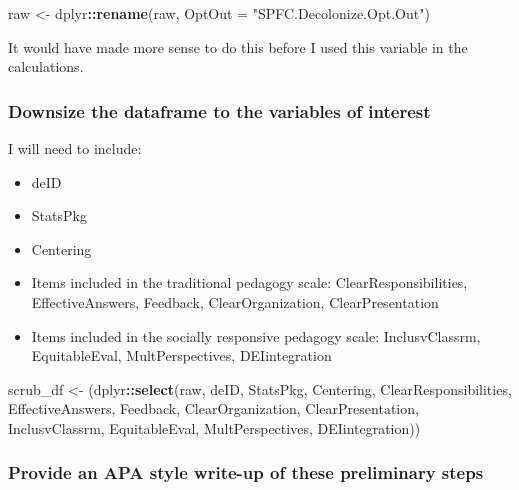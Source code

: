 \documentclass[
  11pt,
]{book}
\newenvironment{Shaded}{\begin{snugshade}}{\end{snugshade}}
\newcommand{\AttributeTok}[1]{\textcolor[rgb]{0.27,0.27,0.27}{#1}}
\newcommand{\FunctionTok}[1]{\textcolor[rgb]{0.27,0.27,0.27}{\textbf{#1}}}
\newcommand{\NormalTok}[1]{#1}
\newcommand{\OtherTok}[1]{\textcolor[rgb]{0.37,0.37,0.37}{#1}}
\newcommand{\SpecialCharTok}[1]{\textcolor[rgb]{0.43,0.43,0.43}{\textbf{#1}}}
\newcommand{\StringTok}[1]{\textcolor[rgb]{0.5,0.5,0.5}{#1}}
\providecommand{\tightlist}{%
  \setlength{\itemsep}{0pt}\setlength{\parskip}{0pt}}
\begin{document}
\begin{Shaded}
\begin{Highlighting}[]
\NormalTok{raw }\OtherTok{\textless{}{-}}\NormalTok{ dplyr}\SpecialCharTok{::}\FunctionTok{rename}\NormalTok{(raw, }\AttributeTok{OptOut =} \StringTok{"SPFC.Decolonize.Opt.Out"}\NormalTok{)}
\end{Highlighting}
\end{Shaded}

It would have made more sense to do this before I used this variable in the calculations.

\hypertarget{downsize-the-dataframe-to-the-variables-of-interest}{%
\subsubsection*{Downsize the dataframe to the variables of interest}\label{downsize-the-dataframe-to-the-variables-of-interest}}


I will need to include:

\begin{itemize}
\tightlist
\item
  deID
\item
  StatsPkg
\item
  Centering
\item
  Items included in the traditional pedagogy scale: ClearResponsibilities, EffectiveAnswers, Feedback, ClearOrganization, ClearPresentation
\item
  Items included in the socially responsive pedagogy scale: InclusvClassrm, EquitableEval, MultPerspectives, DEIintegration
\end{itemize}

\begin{Shaded}
\begin{Highlighting}[]
\NormalTok{scrub\_df }\OtherTok{\textless{}{-}}\NormalTok{ (dplyr}\SpecialCharTok{::}\FunctionTok{select}\NormalTok{(raw, deID, StatsPkg, Centering, ClearResponsibilities,}
\NormalTok{    EffectiveAnswers, Feedback, ClearOrganization, ClearPresentation, InclusvClassrm,}
\NormalTok{    EquitableEval, MultPerspectives, DEIintegration))}
\end{Highlighting}
\end{Shaded}

\hypertarget{provide-an-apa-style-write-up-of-these-preliminary-steps}{%
\subsubsection*{Provide an APA style write-up of these preliminary steps}\label{provide-an-apa-style-write-up-of-these-preliminary-steps}}
\end{document}
